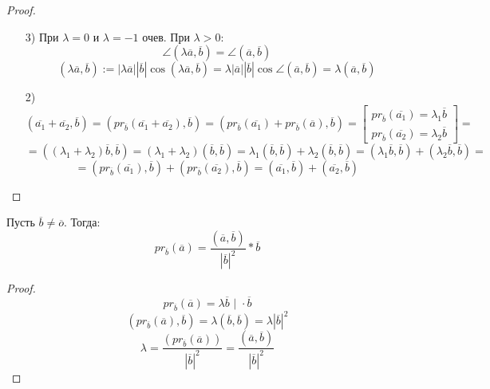 \begin{proof}
    \begin{enumerate}
        \item [3) ] При $\lambda = 0$ и $\lambda = -1$ очев. При $\lambda > 0\colon $
            \[
            \angle (\lambda\overline{a}, \overline{b}) = \angle (\overline{a}, \overline{b})
            \] 
            \[
                (\lambda\overline{a}, \overline{b}) := |\lambda\overline{a}||\overline{b}|\cos (\lambda\overline{a}, \overline{b}) = \lambda |\overline{a}||\overline{b}| \cos \angle (\overline{a}, \overline{b}) = \lambda (\overline{a}, \overline{b})
            \] 
        \item [2) ] \[
                (\overline{a_1} + \overline{a_2}, \overline{b}) = (pr_{\overline{b}}(\overline{a_1} + \overline{a_2}), \overline{b}) = (pr_{\overline{b}}(\overline{a_1}) + pr_{\overline{b}}(\overline{a}), \overline{b}) = \begin{bmatrix}pr_{\overline{b}}(\overline{a_1}) = \lambda_1 \overline{b} \\ pr_{\overline{b}}(\overline{a_2}) = \lambda_2 \overline{b} \end{bmatrix} = 
        \] 
        \[
        = ((\lambda_1 + \lambda_2) \overline{b}, \overline{b}) = (\lambda_1 + \lambda_2)(\overline{b}, \overline{b}) =  \lambda_1 (\overline{b}, \overline{b}) + \lambda_2 (\overline{b}, \overline{b}) = (\lambda_1 \overline{b}, \overline{b}) + (\lambda_2 \overline{b}, \overline{b}) =
        \] 
        \[
        =  (pr_{\overline{b}}(\overline{a_1}), \overline{b}) + (pr_{\overline{b}}(\overline{a_2}), \overline{b}) = (\overline{a_1}, \overline{b}) + (\overline{a_2}, \overline{b})
        \] 
    \end{enumerate}
\end{proof}
\begin{statement}
    Пусть $\overline{b} \neq \overline{o}$. Тогда:
    \[
    pr_{\overline{b}}(\overline{a}) = \frac{(\overline{a}, \overline{b})}{|\overline{b}|^{2}} * \overline{b}
    \] 
\end{statement}
\begin{proof}
\[
pr_{\overline{b}}(\overline{a}) = \lambda \overline{b} \text{    | } \cdot \overline{b}
\] 
\[
    (pr_{\overline{b}}(\overline{a}), \overline{b}) = \lambda (\overline{b}, \overline{b}) = \lambda |\overline{b}|^{2}
\] 
\[
    \lambda = \frac{(pr_{\overline{b}}(\overline{a}))}{|\overline{b}|^{2}} = \frac{(\overline{a}, \overline{b})}{|\overline{b}|^{2}}   
\] 
\end{proof}

